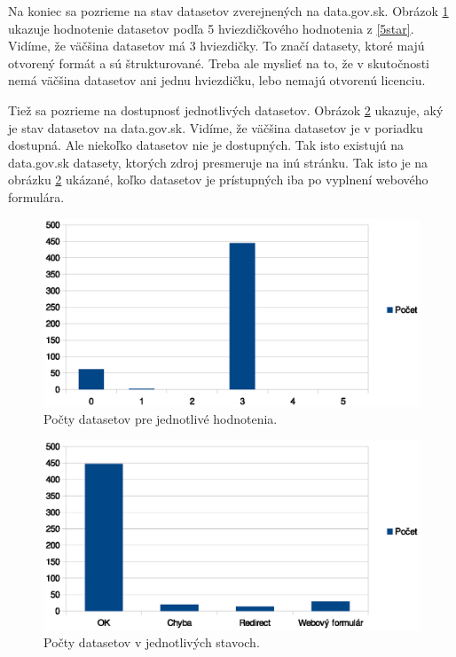 \documentclass[12pt,a4paper]{article}
\begin{document}
Na koniec sa pozrieme na stav datasetov zverejnených na data.gov.sk. Obrázok \ref{stars} ukazuje hodnotenie datasetov podľa 5 hviezdičkového hodnotenia z \ref{5star}. Vidíme, že väčšina datasetov má 3 hviezdičky. To značí datasety, ktoré majú otvorený formát a sú štrukturované. Treba ale myslieť na to, že v skutočnosti nemá väčšina datasetov ani jednu hviezdičku, lebo nemajú otvorenú licenciu.

Tiež sa pozrieme na dostupnosť jednotlivých datasetov. Obrázok \ref{status} ukazuje, aký je stav datasetov na data.gov.sk. Vidíme, že väčšina datasetov je v poriadku dostupná. Ale niekoľko datasetov nie je dostupných. Tak isto existujú na data.gov.sk datasety, ktorých zdroj presmeruje na inú stránku. Tak isto je na obrázku \ref{status} ukázané, koľko datasetov je prístupných iba po vyplnení webového formulára.

\begin{figure}
\center \includegraphics[width=14cm]{stars}
\caption{Počty datasetov pre jednotlivé hodnotenia.}
\label{stars}
\end{figure}

\begin{figure}
\center \includegraphics[width=14cm]{status}
\caption{Počty datasetov v jednotlivých stavoch.}
\label{status}
\end{figure}
\end{document}
